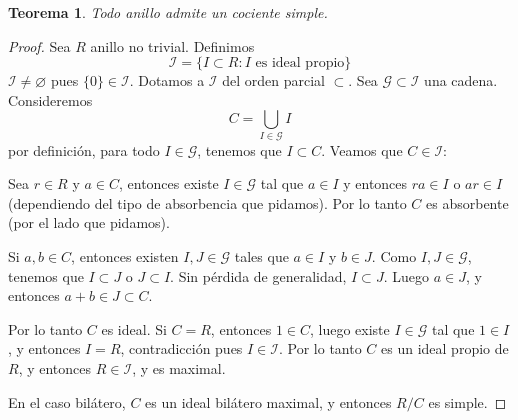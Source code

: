 \documentclass{article}
\newtheorem{theorem}{Teorema}[subsection]
\theoremstyle{definition}
\theoremstyle{remark}
\numberwithin{equation}{section}
\newcommand{\Gcal}{\mathcal{G}}
\newcommand{\Ical}{\mathcal{I}}
\begin{document}
\begin{theorem}
  Todo anillo admite un cociente simple.
\end{theorem}
\begin{proof}
  Sea $R$ anillo no trivial. Definimos 
  \[ \Ical = \{I \subset R \colon I \text{ es ideal propio}\} \]
  $\Ical \neq \varnothing$ pues $\{0\} \in \Ical$. Dotamos a $\Ical$ del orden parcial $\subset$. Sea $\Gcal \subset \Ical$ una cadena. Consideremos 
  \[ C = \bigcup_{I \in \Gcal} I \]
  por definición, para todo $I \in \Gcal$, tenemos que $I \subset C$. Veamos que $C \in \Ical$:

  Sea $r \in R$ y $a \in C$, entonces existe $I \in \Gcal$ tal que $a \in I$ y entonces $ra \in I$ o $ar \in I$ (dependiendo del tipo de absorbencia que pidamos). Por lo tanto $C$ es absorbente (por el lado que pidamos).

  Si $a,b \in C$, entonces existen $I,J \in \Gcal$ tales que $a \in I$ y $b \in J$. Como $I,J \in \Gcal$, tenemos que $I \subset J$ o $J \subset I$. Sin pérdida de generalidad, $I \subset J$. Luego $a \in J$, y entonces $a+b \in J \subset C$.

  Por lo tanto $C$ es ideal. Si $C = R$, entonces $1 \in C$, luego existe $I \in \Gcal$ tal que $1 \in I$, y entonces $I = R$, contradicción pues $I \in \Ical$. Por lo tanto $C$ es un ideal propio de $R$, y entonces $R \in \Ical$, y es maximal.

  En el caso bilátero, $C$ es un ideal bilátero maximal, y entonces $R/C$ es simple.
\end{proof}
\end{document}
